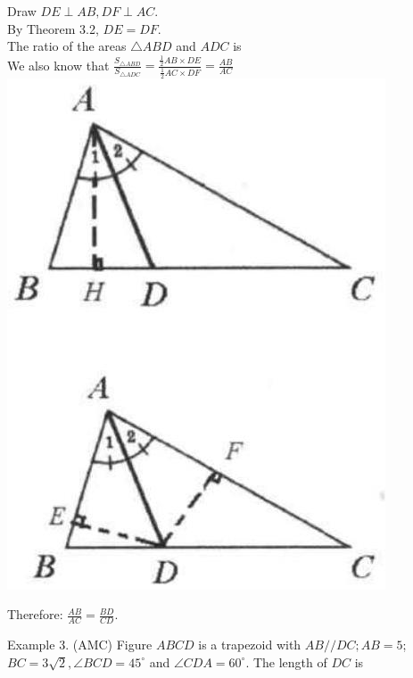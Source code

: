 \documentclass[10pt]{article}
\begin{document}
Draw \(D E \perp A B, D F \perp A C\).\\
By Theorem 3.2, \(D E=D F\).\\
The ratio of the areas \(\triangle A B D\) and \(A D C\) is\\
We also know that \(\frac{S_{\triangle A B D}}{S_{\triangle A D C}}=\frac{\frac{1}{2} A B \times D E}{\frac{1}{2} A C \times D F}=\frac{A B}{A C}\)\\
\includegraphics[max width=\textwidth, center]{2025_04_17_97bc1f7e44d93c271a88g-075(2)}


Therefore: \(\frac{A B}{A C}=\frac{B D}{C D}\).

Example 3. (AMC) Figure \(A B C D\) is a trapezoid with \(A B / / D C ; A B=5\);\\
\(B C=3 \sqrt{2}, \angle B C D=45^{\circ}\) and \(\angle C D A=60^{\circ}\). The length of \(D C\) is
\end{document}
